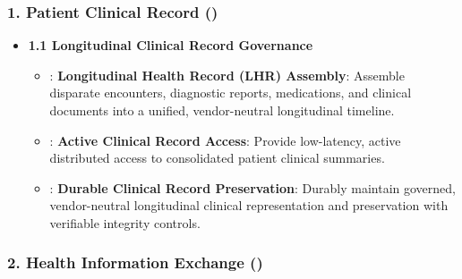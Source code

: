 \subsubsection*{1. Patient Clinical Record (\texttt{})}
\label{rad:enabling:609}

\begin{itemize}

\item
\textbf{1.1 Longitudinal Clinical Record Governance}


\begin{itemize}

\item
\texttt{}: \textbf{Longitudinal Health Record (LHR) Assembly}: Assemble disparate encounters, diagnostic reports, medications, and clinical documents into a unified, vendor-neutral longitudinal timeline.



\item
\texttt{}: \textbf{Active Clinical Record Access}: Provide low-latency, active distributed access to consolidated patient clinical summaries.



\item
\texttt{}: \textbf{Durable Clinical Record Preservation}: Durably maintain governed, vendor-neutral longitudinal clinical representation and preservation with verifiable integrity controls.



\end{itemize}


\end{itemize}
\label{rad:enabling:614}
\subsubsection*{2. Health Information Exchange (\texttt{})}
\label{rad:enabling:615}

